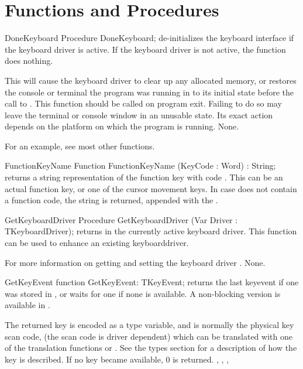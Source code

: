 \section{Functions and Procedures}

\begin{procedure}{DoneKeyboard}
\Declaration
Procedure DoneKeyboard;
\Description
{} de-initializes the keyboard interface if the keyboard
driver is active. If the keyboard driver is not active, the function does
nothing.

This will cause the keyboard driver to clear up any allocated memory, 
or restores the console or terminal the program was running in to its 
initial state before the call to . This function should 
be called on program exit. Failing to do so may leave the terminal or
console window in an unusable state. Its exact action depends on the 
platform on which the program is running.
\Errors
None.
\SeeAlso
{}
\end{procedure}

For an example, see most other functions.

\begin{function}{FunctionKeyName}
\Declaration
Function FunctionKeyName (KeyCode : Word) : String;
\Description
{} returns a string representation of the function key
with code . This can be an actual function key, or one of the
cursor movement keys.
\Errors
In case  does not contain a function code, the
 string is returned, appended with the
.
\SeeAlso
{}
\end{function}


\begin{procedure}{GetKeyboardDriver}
\Declaration
Procedure GetKeyboardDriver (Var Driver : TKeyboardDriver);
\Description
{} returns in  the currently active
keyboard driver. This function can be used to enhance an existing
keyboarddriver.

For more information on getting and setting the keyboard driver
.
\Errors
None.
\SeeAlso
{}
\end{procedure}

\begin{function}{GetKeyEvent}
\Declaration
function GetKeyEvent: TKeyEvent;
\Description
{} returns the last keyevent if one was stored in
, or waits for one if none is available.
A non-blocking version is available in .

The returned key is encoded as a  type variable, and
is normally the physical key scan code, (the scan code is driver 
dependent) which can be translated with one of the translation 
functions  or . 
See the types section for a description of how the key is described.
\Errors
If no key became available, 0 is returned.
\SeeAlso
{}, , ,
\end{function}

